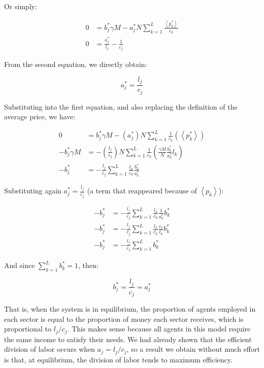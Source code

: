 Or simply:

\begin{align*}
0 & =b_{j}^{*}\gamma M-a_{j}^{*}N\sum_{k=1}^{L}\frac{\left\langle p_{k}^{*}\right\rangle }{c_{k}}\\
0 & =\frac{a_{j}^{*}}{l_{j}}-\frac{1}{c_{j}}
\end{align*}

From the second equation, we directly obtain:


$$a_{j}^{*}=\frac{l_{j}}{c_{j}}$$

Substituting into the first equation, and also replacing the definition of the average price, we have:

\begin{align*}
0 & =b_{j}^{*}\gamma M-\left(a_{j}^{*}\right)N\sum_{k=1}^{L}\frac{1}{c_{k}}\left(\left\langle p_{k}^{*}\right\rangle \right)\\
-b_{j}^{*}\gamma M & =-\left(\frac{l_{j}}{c_{j}}\right)N\sum_{k=1}^{L}\frac{1}{c_{k}}\left(\frac{\gamma M}{N}\frac{b_{k}^{*}}{a_{k}^{*}}l_{k}\right)\\
-b_{j}^{*} & =-\frac{l_{j}}{c_{j}}\sum_{k=1}^{L}\frac{l_{k}}{c_{k}}\frac{b_{k}^{*}}{a_{k}^{*}}
\end{align*}

Substituting again $a_{j}^{*}=\frac{l_{j}}{c_{j}}$ (a term that reappeared because of $\left\langle p_{k}\right\rangle$):


\begin{align*}
-b_{j}^{*} & =-\frac{l_{j}}{c_{j}}\sum_{k=1}^{L}\frac{l_{k}}{c_{k}}\frac{1}{a_{k}^{*}}b_{k}^{*}\\
-b_{j}^{*} & =-\frac{l_{j}}{c_{j}}\sum_{k=1}^{L}\frac{l_{k}}{c_{k}}\frac{c_{k}}{l_{k}}b_{k}^{*}\\
-b_{j}^{*} & =-\frac{l_{j}}{c_{j}}\sum_{k=1}^{L}b_{k}^{*}
\end{align*}

And since $\sum_{k=1}^{L}b_{k}^{*}=1$, then:

$$b_{j}^{*}=\frac{l_{j}}{c_{j}}=a_{j}^{*}$$

That is, when the system is in equilibrium, the proportion of agents employed in each sector is equal to the proportion of money each sector receives, which is proportional to $l_{j}/c_{j}$. This makes sense because all agents in this model require the same income to satisfy their needs. We had already shown that the efficient division of labor occurs when $a_{j}=l_{j}/c_{j}$, so a result we obtain without much effort is that, at equilibrium, the division of labor tends to maximum efficiency.

